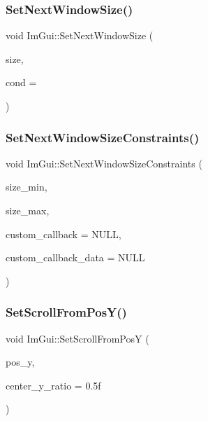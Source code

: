 \subsubsection{\texorpdfstring{Set\+Next\+Window\+Size()}{SetNextWindowSize()}}
{\footnotesize\ttfamily void Im\+Gui\+::\+Set\+Next\+Window\+Size (\begin{DoxyParamCaption}\item[{const \hyperlink{struct_im_vec2}{Im\+Vec2} \&}]{size,  }\item[{Im\+Gui\+Cond}]{cond = {} }\end{DoxyParamCaption})}

\hypertarget{namespace_im_gui_a06f40aaf9cf2539c8dba43156a131e45}{}\label{namespace_im_gui_a06f40aaf9cf2539c8dba43156a131e45} 
\subsubsection{\texorpdfstring{Set\+Next\+Window\+Size\+Constraints()}{SetNextWindowSizeConstraints()}}
{\footnotesize\ttfamily void Im\+Gui\+::\+Set\+Next\+Window\+Size\+Constraints (\begin{DoxyParamCaption}\item[{const \hyperlink{struct_im_vec2}{Im\+Vec2} \&}]{size\+\_\+min,  }\item[{const \hyperlink{struct_im_vec2}{Im\+Vec2} \&}]{size\+\_\+max,  }\item[{Im\+Gui\+Size\+Constraint\+Callback}]{custom\+\_\+callback = {\ttfamily NULL},  }\item[{void $\ast$}]{custom\+\_\+callback\+\_\+data = {\ttfamily NULL} }\end{DoxyParamCaption})}

\hypertarget{namespace_im_gui_a57d8e9497ad39584ba740cef70b78fb4}{}\label{namespace_im_gui_a57d8e9497ad39584ba740cef70b78fb4} 
\subsubsection{\texorpdfstring{Set\+Scroll\+From\+Pos\+Y()}{SetScrollFromPosY()}}
{\footnotesize\ttfamily void Im\+Gui\+::\+Set\+Scroll\+From\+PosY (\begin{DoxyParamCaption}\item[{float}]{pos\+\_\+y,  }\item[{float}]{center\+\_\+y\+\_\+ratio = {\ttfamily 0.5f} }\end{DoxyParamCaption})}

